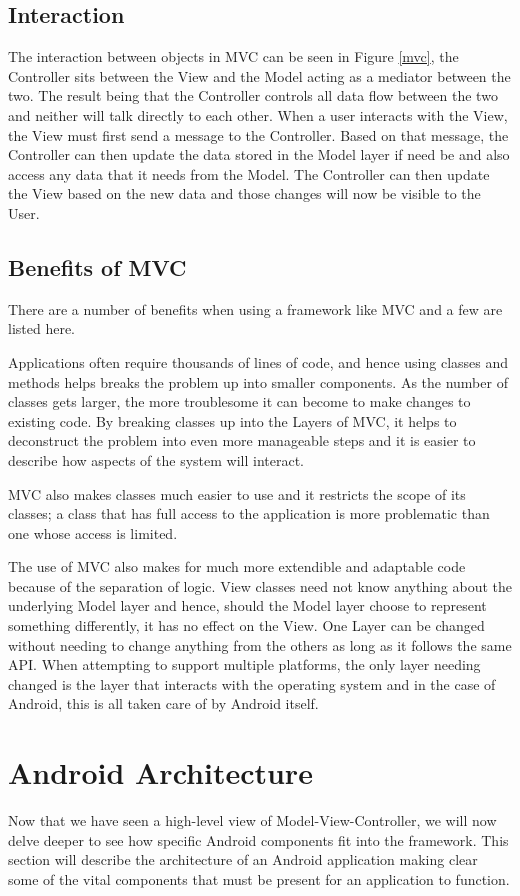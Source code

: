 \documentclass{l4proj}
\begin{document}
\subsection{Interaction}
The interaction between objects in MVC can be seen in Figure \ref{mvc}, the Controller sits between the View and the Model acting as a mediator between the two.  The result being that the Controller controls all data flow between the two and neither will talk directly to each other.  When a user interacts with the View, the View must first send a message to the Controller.  Based on that message, the Controller can then update the data stored in the Model layer if need be and also access any data that it needs from the Model.  The Controller can then update the View based on the new data and those changes will now be visible to the User.  

\subsection{Benefits of MVC}
There are a number of benefits when using a framework like MVC and a few are listed here.

Applications often require thousands of lines of code, and hence using classes and methods helps breaks the problem up into smaller components. As the number of classes gets larger, the more troublesome it can become to make changes to existing code. By breaking classes up into the Layers of MVC, it helps to deconstruct the problem into even more manageable steps and it is easier to describe how aspects of the system will interact.

MVC also makes classes much easier to use and it restricts the scope of its classes; a class that has full access to the application is more problematic than one whose access is limited. 

The use of MVC also makes for much more extendible and adaptable code because of the separation of logic.  View classes need not know anything about the underlying Model layer and hence, should the Model layer choose to represent something differently, it has no effect on the View. One Layer can be changed without needing to change anything from the others as long as it follows the same API. When attempting to support multiple platforms, the only layer needing changed is the layer that interacts with the operating system and in the case of Android, this is all taken care of by Android itself.

\section{Android Architecture}
Now that we have seen a high-level view of Model-View-Controller, we will now delve deeper to see how specific Android components fit into the framework. This section will describe the architecture of an Android application making clear some of the vital components that must be present for an application to function.  
\end{document}
